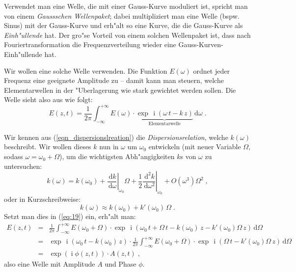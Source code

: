 \documentclass[twoside,a4paper]{book}
\newcommand{\diff}{\ensuremath{\, \mathrm{d}}}
\newcommand{\I}{\ensuremath{\operatorname{i}}}
\begin{document}
Verwendet man eine Welle, die mit einer Gauss-Kurve moduliert ist,
spricht man von einem \emph{Gaussschen
  Wellenpaket}; dabei multipliziert man eine Welle (bspw. Sinus) mit
der Gauss-Kurve und erh"alt so eine Kurve, die die Gauss-Kurve als
\emph{Einh"ullende} hat. Der gro"se Vorteil von einem solchen
Wellenpaket ist, dass nach Fouriertransformation die
Frequenzverteilung wieder eine Gauss-Kurven-Einh"ullende hat.

Wir wollen eine solche Welle verwenden. Die Funktion $E(\omega)$
ordnet jeder Frequenz eine geeignete Amplitude zu -- damit kann man
steuern, welche Elementarwellen in der "Uberlagerung wie stark
gewichtet werden sollen. Die Welle sieht also aus wie folgt:
\begin{equation}
   \label{eq:19}
   E(z,t) = \frac{1}{2\pi} \int_{- \infty}^{+ \infty} E(\omega) \cdot
   \underbrace{ \exp \, \I \left ( \omega \, t - k \, z  \right )
   }_\text{Elementarwelle} \diff \omega \;.
\end{equation}

Wir kennen aus (\ref{eqn_dispersionslreation}) die
\emph{Dispersionsrelation}, welche $k(\omega)$ beschreibt. Wir wollen
dieses $k$ nun in $\omega$ um $\omega_0$ entwickeln (mit neuer Variable
$\Omega$, sodass $\omega = \omega_0 + \Omega$), um die wichtigsten
Abh"angigkeiten $k$s von $\omega$ zu untersuchen:
\begin{equation}
   \label{eq:20}
   k(\omega) = k(\omega_0) +  \left . \frac{\diff k}{\diff \omega}
   \right | _{\omega_0} \Omega + \frac{1}{2}\left . \frac{\diff^2 k}{\diff \omega^2}
   \right | _{\omega_0} + O(\omega^3) \Omega^2  \;,
\end{equation}
oder in Kurzschreibweise:
\begin{equation*}
k(\omega) \approx k(\omega_0) + k'(\omega_0) \, \Omega 
\;.
\end{equation*}
Setzt man dies in (\ref{eq:19}) ein, erh"alt man:
\begin{eqnarray}
\nonumber
     E(z,t) &=& \frac{1}{2\pi} \int_{- \infty}^{+ \infty} E(\omega_0 +
     \Omega) \cdot
    \exp \, \I \left ( \omega_0 \, t + \Omega \, t -  k(\omega_0)\,z  -
       k'(\omega_0)\Omega \, z    \right )
    \diff \Omega\\
&=&
\nonumber
\exp \, \I \left ( \omega_0 \, t - k(\omega_0)\, z \right ) \cdot 
\frac{1}{2\pi} \int_{- \infty}^{+ \infty} E(\omega_0 + \Omega) \cdot
    \exp \, \I \left ( \Omega \, t - k'(\omega_0)\Omega \, z    \right )
    \diff \Omega \\
&=&
\label{eq:23}
\exp \left ( \I \phi(z,t) \right ) \cdot A(z,t) \;,
\end{eqnarray}
also eine Welle mit Amplitude $A$ und Phase $\phi$.
\end{document}
